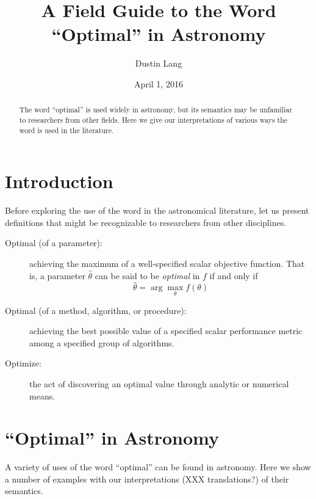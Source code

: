 \documentclass[12pt, preprint]{aastex}
\begin{document}
\title{A Field Guide to the Word ``Optimal'' in Astronomy}

\author{%
Dustin Lang%
}
\date{April 1, 2016}

\begin{abstract}
The word ``optimal'' is used widely in astronomy, but its semantics
may be unfamiliar to researchers from other fields.  Here we give
our interpretations of various ways the word is used in the literature.
\end{abstract}


\section{Introduction}

Before exploring the use of the word in the astronomical literature, let
us present definitions that might be recognizable to researchers from other
disciplines.

\begin{description}
\item[Optimal (of a parameter):] achieving the maximum of a
  well-specified scalar objective function.  That is, a parameter
  $\hat{\theta}$ can be said to be \emph{optimal} in $f$ if and only
  if
  \[
  \hat{\theta} = \arg\max_{\theta} f(\theta)
  \]
\item[Optimal (of a method, algorithm, or procedure):] achieving the
  best possible value of a specified scalar performance metric among a
  specified group of algorithms.
\item[Optimize:] the act of discovering an optimal value through analytic or
  numerical means.
\end{description}

\section{``Optimal'' in Astronomy}

A variety of uses of the word ``optimal'' can be found in astronomy.
Here we show a number of examples with our interpretations (XXX
translations?) of their semantics.
%
\end{document}
